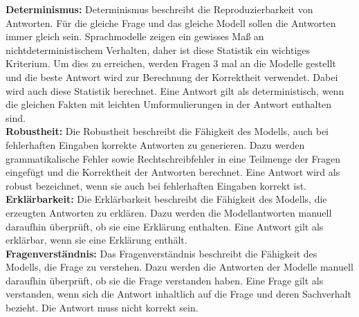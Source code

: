 \noindent\textbf{Determinismus:}\newline
Determinismus beschreibt die Reproduzierbarkeit von Antworten.
Für die gleiche Frage und das gleiche Modell sollen die Antworten immer gleich sein.
Sprachmodelle zeigen ein gewisses Maß an nichtdeterministischem Verhalten, daher ist diese Statistik ein wichtiges Kriterium.
Um dies zu erreichen, werden Fragen 3 mal an die Modelle gestellt und die beste Antwort wird zur Berechnung der Korrektheit verwendet.
Dabei wird auch diese Statistik berechnet.
Eine Antwort gilt als deterministisch, wenn die gleichen Fakten mit leichten Umformulierungen in der Antwort enthalten sind.\\

\noindent\textbf{Robustheit:}\newline
Die Robustheit beschreibt die Fähigkeit des Modells, auch bei fehlerhaften Eingaben korrekte Antworten zu generieren.
Dazu werden grammatikalische Fehler sowie Rechtschreibfehler in eine Teilmenge der Fragen eingefügt und die Korrektheit der Antworten berechnet.
Eine Antwort wird als robust bezeichnet, wenn sie auch bei fehlerhaften Eingaben korrekt ist.\\

\noindent\textbf{Erklärbarkeit:}\newline
Die Erklärbarkeit beschreibt die Fähigkeit des Modells, die erzeugten Antworten zu erklären.
Dazu werden die Modellantworten manuell daraufhin überprüft, ob sie eine Erklärung enthalten.
Eine Antwort gilt als erklärbar, wenn sie eine Erklärung enthält.\\

\noindent\textbf{Fragenverständnis:}\newline
Das Fragenverständnis beschreibt die Fähigkeit des Modells, die Frage zu verstehen.
Dazu werden die Antworten der Modelle manuell daraufhin überprüft, ob sie die Frage verstanden haben. Eine Frage gilt als verstanden, wenn sich die Antwort inhaltlich auf die Frage und deren Sachverhalt bezieht. Die Antwort muss nicht korrekt sein.
